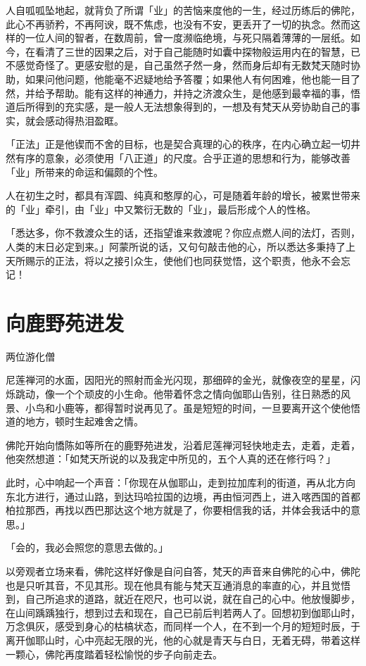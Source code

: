 \documentclass[12pt,twoside,openany]{book}
\begin{document}
人自呱呱坠地起，就背负了所谓「业」的苦恼来度他的一生，经过历练后的佛陀，此心不再骄矜，不再阿谀，既不焦虑，也没有不安，更丢开了一切的执念。然而这样的一位人间的智者，在数周前，曾一度濒临绝境，与死只隔着薄薄的一层纸。如今，在看清了三世的因果之后，对于自己能随时如囊中探物般运用内在的智慧，已不感觉奇怪了。更感安慰的是，自己虽然孑然一身，然而身后却有无数梵天随时协助，如果问他问题，他能毫不迟疑地给予答覆；如果他人有何困难，他也能一目了然，并给予帮助。能有这样的神通力，并持之济渡众生，是他感到最幸福的事，悟道后所得到的充实感，是一般人无法想象得到的，一想及有梵天从旁协助自己的事实，就会感动得热泪盈眶。

「正法」正是他锲而不舍的目标，也是契合真理的心的秩序，在内心确立起一切井然有序的意象，必须使用「八正道」的尺度。合乎正道的思想和行为，能够改善「业」所带来的命运和偏颇的个性。

人在初生之时，都具有浑圆、纯真和憨厚的心，可是随着年龄的增长，被累世带来的「业」牵引，由「业」中又繁衍无数的「业」，最后形成个人的性格。

「悉达多，你不救渡众生的话，还指望谁来救渡呢？你应点燃人间的法灯，否则，人类的末日必定到来。」阿蒙所说的话，又句句敲击他的心，所以悉达多秉持了上天所赐示的正法，将以之接引众生，使他们也同获觉悟，这个职责，他永不会忘记！

\section{向鹿野苑进发}\label{sec2.2}

两位游化僧

尼莲禅河的水面，因阳光的照射而金光闪现，那细碎的金光，就像夜空的星星，闪烁跳动，像一个个顽皮的小生命。他带着怀念之情向伽耶山告别，往日熟悉的风景、小鸟和小鹿等，都得暂时说再见了。虽是短短的时间，一旦要离开这个使他悟道的地方，顿时生起难舍之情。

佛陀开始向憍陈如等所在的鹿野苑进发，沿着尼莲禅河轻快地走去，走着，走着，他突然想道：「如梵天所说的以及我定中所见的，五个人真的还在修行吗？」

此时，心中响起一个声音：「你现在从伽耶山，走到拉加库利的街道，再从北方向东北方进行，通过山路，到达玛哈拉国的边境，再由恒河西上，进入喀西国的首都柏拉那西，再找以西巴那达这个地方就是了，你要相信我的话，并体会我话中的意思。」

「会的，我必会照您的意思去做的。」

以旁观者立场来看，佛陀这样好像是自问自答，梵天的声音来自佛陀的心中，佛陀也是只听其音，不见其形。现在他具有能与梵天互通消息的率直的心，并且觉悟到，自己所追求的道路，就近在咫尺，也可以说，就在自己的心中。他放慢脚步，在山间踽踽独行，想到过去和现在，自己已前后判若两人了。回想初到伽耶山时，万念俱灰，感受到身心的枯槁状态，而同样一个人，在不到一个月的短短时辰，于离开伽耶山时，心中亮起无限的光，他的心就是青天与白日，无着无碍，带着这样一颗心，佛陀再度踏着轻松愉悦的步子向前走去。
\end{document}
